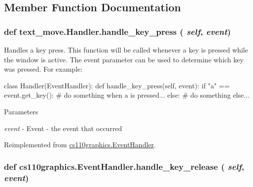 \subsection{Member Function Documentation}
\hypertarget{classtext__move_1_1Handler_a5a42b4eb6df32fce14be58a45a7a82f0}{
\subsubsection[{handle\_\-key\_\-press}]{\setlength{\rightskip}{0pt plus 5cm}def text\_\-move.Handler.handle\_\-key\_\-press ( {\em self}, \/   {\em event})}}
\label{classtext__move_1_1Handler_a5a42b4eb6df32fce14be58a45a7a82f0}


Handles a key press. This function will be called whenever a key is pressed while the window is active. The event parameter can be used to determine which key was pressed. For example: 
\begin{DoxyCode}
 class Handler(EventHandler):
     def handle_key_press(self, event):
         if "a" == event.get_key():
             # do something when a is pressed...
         else:
             # do something else...
\end{DoxyCode}
 
\begin{DoxyParams}{Parameters}
\item[{\em event}]-\/ Event -\/ the event that occurred \end{DoxyParams}


Reimplemented from \hyperlink{classcs110graphics_1_1EventHandler_af3fb3531d0b23f1430a830586cd07906}{cs110graphics.EventHandler}.\hypertarget{classcs110graphics_1_1EventHandler_a2849f60251baa44252992162521f2473}{
\subsubsection[{handle\_\-key\_\-release}]{\setlength{\rightskip}{0pt plus 5cm}def cs110graphics.EventHandler.handle\_\-key\_\-release ( {\em self}, \/   {\em event})}}
\label{classcs110graphics_1_1EventHandler_a2849f60251baa44252992162521f2473}


